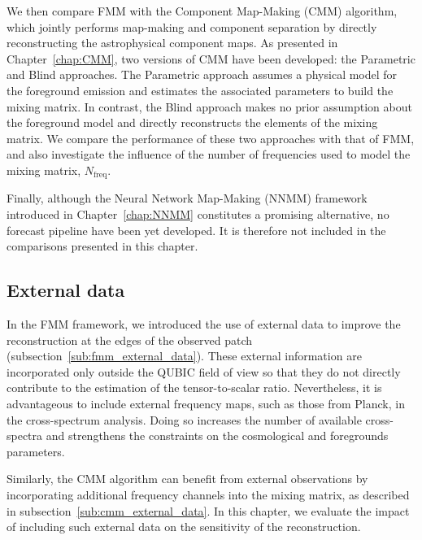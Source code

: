 \documentclass[../../thesis.tex]{subfiles}
\begin{document}
We then compare FMM with the Component Map-Making (CMM) algorithm, which jointly performs map-making and component separation by directly reconstructing the astrophysical component maps. As presented in Chapter~\ref{chap:CMM}, two versions of CMM have been developed: the Parametric and Blind approaches. The Parametric approach assumes a physical model for the foreground emission and estimates the associated parameters to build the mixing matrix. In contrast, the Blind approach makes no prior assumption about the foreground model and directly reconstructs the elements of the mixing matrix. We compare the performance of these two approaches with that of FMM, and also investigate the influence of the number of frequencies used to model the mixing matrix, $N_\text{freq}$.

Finally, although the Neural Network Map-Making (NNMM) framework introduced in Chapter~\ref{chap:NNMM} constitutes a promising alternative, no forecast pipeline have been yet developed. It is therefore not included in the comparisons presented in this chapter.

\subsection{External data}

In the FMM framework, we introduced the use of external data to improve the reconstruction at the edges of the observed patch (subsection~\ref{sub:fmm_external_data}). These external information are incorporated only outside the QUBIC field of view so that they do not directly contribute to the estimation of the tensor-to-scalar ratio. Nevertheless, it is advantageous to include external frequency maps, such as those from Planck, in the cross-spectrum analysis. Doing so increases the number of available cross-spectra and strengthens the constraints on the cosmological and foregrounds parameters.

Similarly, the CMM algorithm can benefit from external observations by incorporating additional frequency channels into the mixing matrix, as described in subsection~\ref{sub:cmm_external_data}. In this chapter, we evaluate the impact of including such external data on the sensitivity of the reconstruction.

\end{document}
